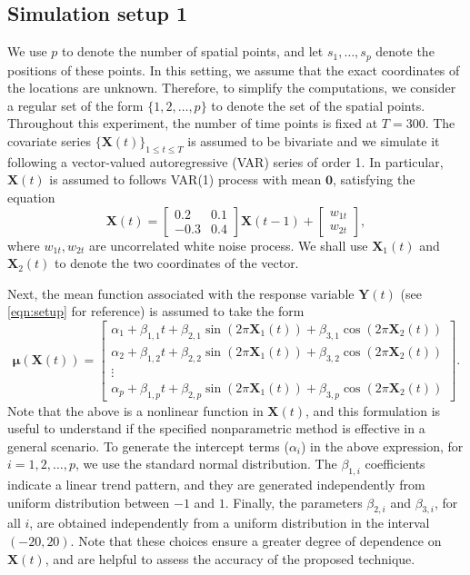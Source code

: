 \documentclass[aos]{imsart}
\theoremstyle{plain}
\theoremstyle{remark}
\newcommand{\bb}[1]{\boldsymbol{#1}}
\begin{document}
\subsection{Simulation setup 1}

We use $p$ to denote the number of spatial points, and let $s_1,\hdots,s_p$ denote the positions of these points. In this setting, we assume that the exact coordinates of the locations are unknown. Therefore, to simplify the computations, we consider a regular set of the form $\{1,2,\hdots,p\}$ to denote the set of the spatial points. Throughout this experiment, the number of time points is fixed at $T=300$. The covariate series $\{\bb{X}(t)\}_{1\leqslant t\leqslant T}$ is assumed to be bivariate and we simulate it following a vector-valued autoregressive (VAR) series of order 1. In particular, $\bb{X}(t)$ is assumed to follows VAR(1) process with mean $\bb{0}$, satisfying the equation
\begin{equation*}
        \bb{X}(t) = \begin{bmatrix}
          0.2 & 0.1\\
          -0.3 & 0.4
        \end{bmatrix}
        \bb{X}(t-1) + \begin{bmatrix}
          w_{1t}\\
          w_{2t}
        \end{bmatrix},
\end{equation*}
where $w_{1t}, w_{2t}$ are uncorrelated white noise process. We shall use $\bb{X}_1(t)$ and $\bb{X}_2(t)$ to denote the two coordinates of the vector.
    
Next, the mean function associated with the response variable $\bb{Y}(t)$ (see \eqref{eqn:setup} for reference) is assumed to take the form
\begin{equation*}
        \bb{\mu}(\bb{X}(t)) = \begin{bmatrix}
          \alpha_1 + \beta_{1,1} t + \beta_{2,1}\sin(2\pi \bb{X}_1(t)) + \beta_{3,1}\cos(2\pi \bb{X}_2(t)) \\
          \alpha_2 + \beta_{1,2} t + \beta_{2,2}\sin(2\pi \bb{X}_1(t)) + \beta_{3,2}\cos(2\pi \bb{X}_2(t)) \\
          \vdots \\
          \alpha_p + \beta_{1,p} t + \beta_{2,p}\sin(2\pi \bb{X}_1(t)) + \beta_{3,p}\cos(2\pi \bb{X}_2(t))
    \end{bmatrix}.
\end{equation*}
\noindent Note that the above is a nonlinear function in $\bb{X}(t)$, and this formulation is useful to understand if the specified nonparametric method is effective in a general scenario. To generate the intercept terms ($\alpha_i$) in the above expression, for $i = 1, 2, \dots, p$, we use the standard normal distribution. The $\beta_{1,i}$ coefficients indicate a linear trend pattern, and they are generated independently from uniform distribution between $-1$ and $1$. Finally, the parameters $\beta_{2,i}$ and $\beta_{3,i}$, for all $i$, are obtained independently from a uniform distribution in the interval $(-20, 20)$. Note that these choices ensure a greater degree of dependence on $\bb{X}(t)$, and are helpful to assess the accuracy of the proposed technique. 
\end{document}
